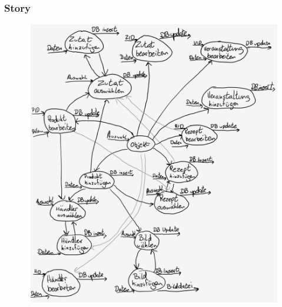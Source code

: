\begin{frame}
	\frametitle{Story}
	\begin{figure}
	\includegraphics[scale=0.125]{bilder/bubble.png}
	\end{figure}
\end{frame}